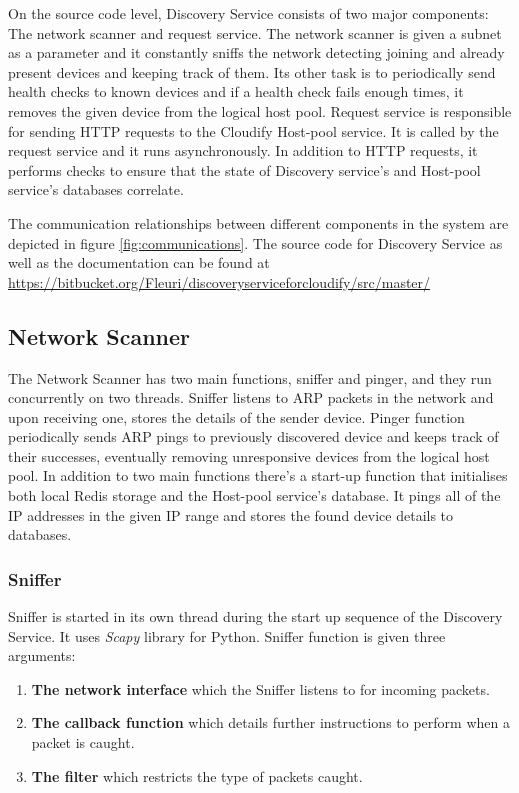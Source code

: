 On the source code level, Discovery Service consists of two major components: The network scanner and request service. The network scanner is given a subnet as a parameter and it constantly sniffs the network detecting joining and already present devices and keeping track of them. Its other task is to periodically send health checks to known devices and if a health check fails enough times, it removes the given device from the logical host pool. Request service is responsible for sending HTTP requests to the Cloudify Host-pool service. It is called by the request service and it runs asynchronously. In addition to HTTP requests, it performs checks to ensure that the state of Discovery service's and Host-pool service's databases correlate.

The communication relationships between different components in the system are depicted in figure \ref{fig:communications}. The source code for Discovery Service as well as the documentation can be found at \url{https://bitbucket.org/Fleuri/discoveryserviceforcloudify/src/master/}

\subsection{Network Scanner}

The Network Scanner has two main functions, sniffer and pinger, and they run concurrently on two threads. Sniffer listens to ARP packets in the network and upon receiving one, stores the details of the sender device. Pinger function periodically sends ARP pings to previously discovered device and keeps track of their successes, eventually removing unresponsive devices from the logical host pool. In addition to two main functions there's a start-up function that initialises both local Redis storage and the Host-pool service's database. It pings all of the IP addresses in the given IP range and stores the found device details to databases.

\subsubsection{Sniffer}

Sniffer is started in its own thread during the start up sequence of the Discovery Service. It uses \textit{Scapy} library \cite{scapy} for Python. Sniffer function is given three arguments: 

\begin{enumerate}
\item \textbf{The network interface} which the Sniffer listens to for incoming packets.
\item \textbf{The callback function} which details further instructions to perform when a packet is caught.
\item \textbf{The filter} which restricts the type of packets caught.
\end{enumerate}


